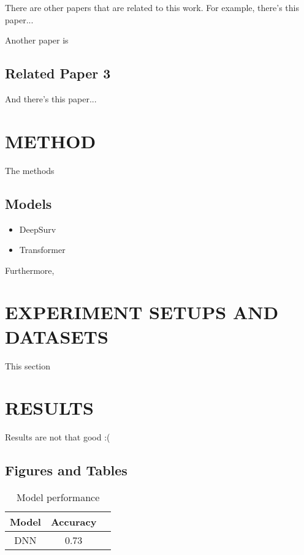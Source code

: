\documentclass[conference]{ieeeconf}
\begin{document}
There are other papers that are related to this work. For example, there's this paper...



Another paper is

\subsection{Related Paper 3}

And there's this paper...



\section{METHOD}

The methods

\subsection{Models}

\begin{itemize}

\item DeepSurv
\item Transformer

\end{itemize}

Furthermore, 


\section{EXPERIMENT SETUPS AND DATASETS}

This section

\section{RESULTS}

Results are not that good :(

\subsection{Figures and Tables}

\begin{table}[h]
\caption{Model performance}
\label{table_example}
\begin{center}
\begin{tabular}{|c|c|c|}
\hline
Model & Accuracy\\
\hline
DNN & 0.73\\
\hline
\end{tabular}
\end{center}
\end{table}
\end{document}
